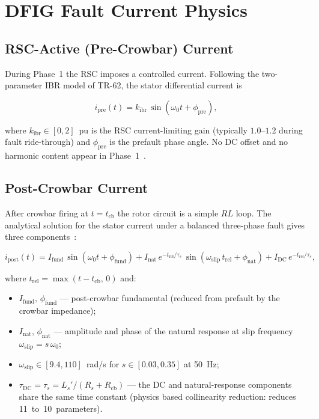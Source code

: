 \documentclass[11pt,a4paper]{article}
\newcommand{\omegaz}{\omega_0}
\newcommand{\omegas}{\omega_{\text{slip}}}
\newcommand{\taus}{\tau_s}
\newcommand{\tcb}{t_{\text{cb}}}
\begin{document}
\section{DFIG Fault Current Physics}
\label{sec:physics}

\subsection{RSC-Active (Pre-Crowbar) Current}
\label{sec:pre}

During Phase~1 the RSC imposes a controlled current.  Following the
two-parameter IBR model of TR-62, the stator differential current is

\begin{equation}
  i_{\text{pre}}(t) = k_{\text{ibr}}\,\sin(\omegaz t + \phi_{\text{pre}}),
  \label{eq:pre}
\end{equation}

where $k_{\text{ibr}}\in[0,2]$~pu is the RSC current-limiting gain (typically
$1.0$--$1.2$ during fault ride-through) and $\phi_{\text{pre}}$ is the
prefault phase angle.  No DC offset and no harmonic content appear in
Phase~1~\cite{Lopez2007}.

\subsection{Post-Crowbar Current}
\label{sec:post}

After crowbar firing at $t = \tcb$ the rotor circuit is a simple $RL$ loop.
The analytical solution for the stator current under a balanced three-phase
fault gives three components~\cite{Pannell2013,Morren2007}:

\begin{equation}
  i_{\text{post}}(t) =
    I_{\text{fund}}\,\sin(\omegaz t + \phi_{\text{fund}})
    + I_{\text{nat}}\,e^{-t_{\text{rel}}/\taus}\,
        \sin(\omegas\,t_{\text{rel}} + \phi_{\text{nat}})
    + I_{\text{DC}}\,e^{-t_{\text{rel}}/\taus},
  \label{eq:post}
\end{equation}

where $t_{\text{rel}} = \max(t - \tcb,\,0)$ and:

\begin{itemize}
  \item $I_{\text{fund}},\,\phi_{\text{fund}}$ — post-crowbar fundamental
        (reduced from prefault by the crowbar impedance);
  \item $I_{\text{nat}},\,\phi_{\text{nat}}$ — amplitude and phase of the
        natural response at slip frequency $\omegas = s\,\omegaz$;
  \item $\omegas\in[9.4, 110]$~rad/s for $s\in[0.03, 0.35]$ at 50~Hz;
  \item $\tau_{\text{DC}} = \taus = L_s'/(R_s + R_{\text{cb}})$ — the DC
        and natural-response components share the same time constant (physics
        based collinearity reduction: reduces 11~to~10~parameters).
\end{itemize}
\end{document}
